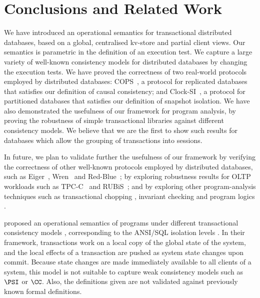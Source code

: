 \section{Conclusions and Related Work}
\label{sec:conclusions}
We have introduced  an  operational semantics for 
transactional distributed databases, based on a global, centralised 
kv-store and partial client views. 
Our semantics is parametric in the definition of an execution test.
We capture a large variety of well-known consistency models 
for distributed databases by changing  the execution tests. 
We have proved the correctness of two real-world protocols employed by distributed 
databases: COPS~\cite{cops}, a 
protocol for replicated databases that satisfies our definition of causal consistency;
and Clock-SI~\cite{clocksi}, a protocol for partitioned databases that satisfies our
definition of 
snapshot isolation. We have also demonstrated the usefulness of our framework
for program analysis, by proving the robustness of simple transactional 
libraries against different consistency models. We believe that we are
the first to show such  results for  databases which  allow
the grouping of  transactions into sessions. 

In future, we plan to validate further the usefulness of our framework
by verifying the correctness of other well-known protocols employed by
distributed databases, such as Eiger~\cite{eiger}, Wren~\cite{wren} and
Red-Blue~\cite{redblue}; by exploring robustness results for OLTP
workloads  such as TPC-C~\cite{tpcc} and RUBiS~\cite{rubis};
and by exploring other program-analysis techniques such as
transactional chopping \cite{chopping,psi-chopping}, invariant checking 
\cite{cise,repliss} and program logics \cite{alonetogether}. 


\citeauthor{alonetogether} proposed an operational semantics of programs 
under different transactional consistency models \cite{alonetogether}, 
corresponding to the ANSI/SQL isolation levels \cite{si}.
In their  framework, transactions work on a local copy of the global state 
of the system, and the local effects of a transaction are pushed as 
system state changes upon commit. Because state changes 
are made immediately available to all clients of a system, this model 
is not suitable to capture weak consistency models such as \(\PSI\) or \(\CC\). 
Also, the definitions given are not validated against previously known 
formal definitions.

